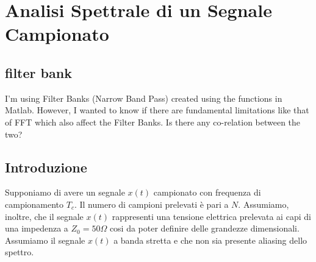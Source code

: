 \documentclass[10pt,a4paper]{book}
\begin{document}
\chapter{Analisi Spettrale di un Segnale  Campionato}
\section{filter bank}
I'm using Filter Banks (Narrow Band Pass) created using the functions in Matlab. However, I wanted to know if there are fundamental limitations like that of FFT which also affect the Filter Banks. Is there any co-relation between the two?


\section{Introduzione}
Supponiamo di avere un segnale $x(t)$  campionato con frequenza di campionamento $T_c$. Il numero di campioni prelevati è pari a $N$. Assumiamo, inoltre, che il segnale $x(t)$ rappresenti una tensione elettrica prelevata ai capi di una impedenza a $Z_0 = 50\Omega$ cosi da poter definire delle grandezze dimensionali. Assumiamo il segnale $x(t)$ a banda stretta e che non sia presente aliasing dello spettro.
\end{document}
